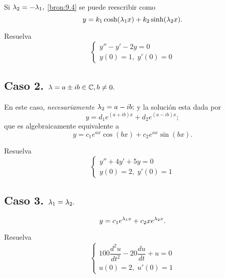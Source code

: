 Si $\lambda_{2}=-\lambda_{1},$ \eqref{bron:9.4} se puede reescribir como
$$
y=k_{1}\cosh(\lambda_{1}x)+k_{2}\sinh(\lambda_{2}x).
$$




\begin{problema}
	\label{bron:exmp:9.1}
	Resuelva
	$$\begin{cases}
		y''-y'-2y=0\\
		y(0)=1, \; y'(0)=0
	\end{cases}
	$$
\end{problema}






\subsection{Caso 2. $\lambda =a\pm ib\in \mathbb{C}, b\neq 0.$}
En este caso, 
\emph{necesariamente} $\lambda_{2}=a-ib;$ y 
la soluci\'on esta dada por
\begin{equation}
	\label{bron:9.5}
	y=d_{1}e^{\left( a+ib \right)x}
	+d_{2}e^{\left( a-ib \right)x};
\end{equation}
que es algebraicamente equivalente a
\begin{equation}
	\label{bron:9.6}
	y=c_{1}e^{ax}\cos(bx)+c_{2}e^{ax}\sin(bx).
\end{equation}





\begin{problema}
	\label{bron:exmp:9.7}
	Resuelva
	$$\begin{cases}
		y''+4y'+5y=0 \\
		y(0)=2, \; y'(0)=1
	\end{cases}
	$$
\end{problema}




\subsection{Caso 3. $\lambda_{1}=\lambda_{2}.$}
\begin{equation}
	\label{bron:9.7}
	y=c_{1}e^{\lambda_{1}x}+c_{2}xe^{\lambda_{2}x}.
\end{equation}





\begin{problema}
	\label{bron:exmp:9.15}
	Resuelva
	$$\begin{cases}
		100\dfrac{d^2{u}}{dt^{2}}
		-20\dfrac{du}{dt}+u=0\\
		u(0)=2, \; u'(0)=1
	\end{cases}
	$$
\end{problema}




